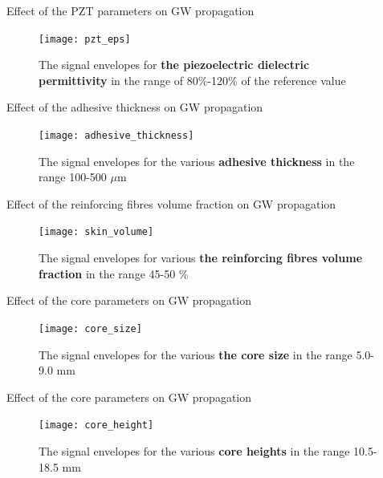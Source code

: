 \documentclass[10pt,aspectratio=169]{beamer} %
\begin{document}
\begin{frame}[label=frame25]{Effect of the PZT parameters on GW propagation}
	\begin{figure}
		\begin{center}
			\texttt{[image: pzt\_eps]}
		\end{center}
		\caption{The signal envelopes for \textbf{the piezoelectric dielectric permittivity} in the range of 80\%-120\% of the reference value}
		\label{fig:pzt_eps}
	\end{figure}
\end{frame}
\begin{frame}[label=frame25]{Effect of the adhesive thickness on GW propagation}
	\begin{figure}
		\begin{center}
			\texttt{[image: adhesive\_thickness]}
		\end{center}
		\caption{The signal envelopes for the various \textbf{adhesive thickness} in the range 100-500 \(\mu\)m}
		\label{fig:adhesive_thickness}
	\end{figure}
\end{frame}
\begin{frame}[label=frame25]{Effect of the reinforcing fibres volume fraction on GW propagation}
	\begin{figure}
		\begin{center}
			\texttt{[image: skin\_volume]}
		\end{center}
		\caption{The signal envelopes for various \textbf{the reinforcing fibres volume fraction} in the range 45-50 \%}
		\label{fig:the reinforcing fibres volume fraction}
	\end{figure}
\end{frame}
\begin{frame}[label=frame25]{Effect of the core parameters on GW propagation}
	\begin{figure}
		\begin{center}
			\texttt{[image: core\_size]}
		\end{center}
		\caption{The signal envelopes for the various \textbf{the core size} in the range 5.0-9.0 mm}
		\label{fig:core_size}
	\end{figure}
\end{frame}

\begin{frame}[label=frame25]{Effect of the core parameters on GW propagation}
	\begin{figure}
		\begin{center}
			\texttt{[image: core\_height]}
		\end{center}
		\caption{The signal envelopes for the various \textbf{core heights} in the range 10.5-18.5 mm}
		\label{fig:core_height}
	\end{figure}
\end{frame}
\end{document}
